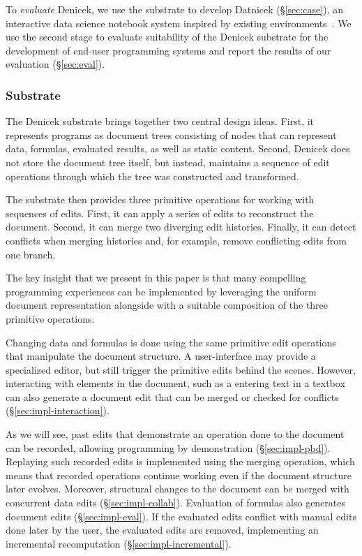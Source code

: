 \documentclass[sigconf,anonymous,screen]{acmart}
\begin{document}
To \emph{evaluate} Denicek, we use the substrate to develop Datnicek (\S\ref{sec:case}), an interactive data
science notebook system inspired by existing environments~\cite{kandel-2011-wrangler,drossos-2020-wrex}.
We use the second stage to evaluate suitability of the Denicek substrate for the development of
end-user programming systems and report the results of our evaluation (\S\ref{sec:eval}).

\subsubsection*{Substrate}
The Denicek substrate brings together two central design ideas. First, it represents programs as
document trees consisting of nodes that can represent data, formulas, evaluated results, as well as
static content. Second, Denicek does not store the document tree itself, but instead, maintains
a sequence of edit operations through which the tree was constructed and transformed.

The substrate then provides three primitive operations for working with sequences of edits.
First, it can apply a series of edits to reconstruct the document. Second, it can merge two
diverging edit histories. Finally, it can detect conflicts when merging histories and, for
example, remove conflicting edits from one branch.

The key insight that we present in this paper is that many compelling programming experiences can
be implemented by leveraging the uniform document representation alongside with a suitable
composition of the three primitive operations.

Changing data and formulas is done using the same primitive edit operations that
manipulate the document structure. A user-interface may provide a specialized editor, but still
trigger the primitive edits behind the scenes. However, interacting with elements in the document,
such as a entering text in a textbox can also generate a document edit that can be merged or checked
for conflicts (\S\ref{sec:impl-interaction}).

As we will see, past edits that demonstrate an operation done to the
document can be recorded, allowing programming by demonstration (\S\ref{sec:impl-pbd}).  Replaying
such recorded edits is implemented using the merging operation, which means that recorded operations
continue working even if the document structure later evolves. Moreover, structural changes to the
document can be merged with concurrent data edits  (\S\ref{sec:impl-collab}). Evaluation of formulas
also generates document edits (\S\ref{sec:impl-eval}). If the evaluated edits conflict with manual
edits done later by the user, the evaluated edits are removed, implementing an incremental
recomputation (\S\ref{sec:impl-incremental}).
\end{document}
